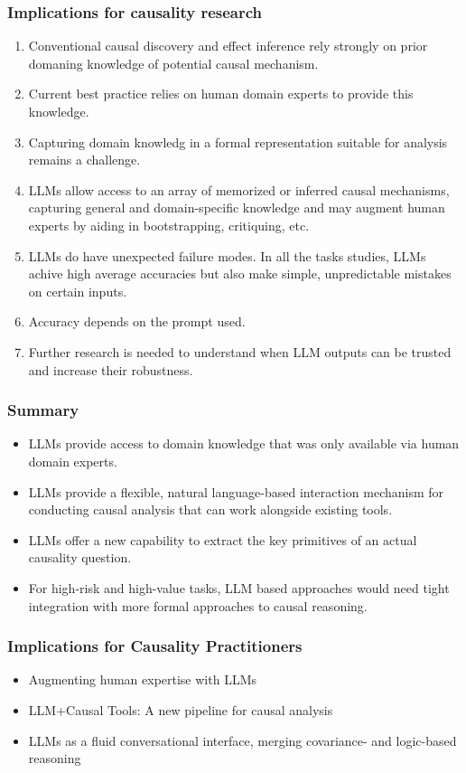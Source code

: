 \documentclass{beamer}
\begin{document}
\begin{frame}
	\frametitle{Implications for causality research}
	\begin{enumerate}
		\item Conventional causal discovery and effect inference rely strongly on prior domaning knowledge of potential causal mechanism. 
		\item Current best practice relies on human domain experts to provide this knowledge.
		\item Capturing domain knowledg in a formal representation suitable for analysis remains a challenge.
		\item LLMs allow access to an array of memorized or inferred causal mechanisms, capturing general and domain-specific knowledge and may augment human experts by aiding in bootstrapping, critiquing, etc.
		\item LLMs do have unexpected failure modes. In all the tasks studies, LLMs achive high average accuracies but also make simple, unpredictable mistakes on certain inputs.
		\item Accuracy depends on the prompt used.
		\item Further research is needed to understand when LLM outputs can be trusted and increase their robustness.
	\end{enumerate}
\end{frame}

\begin{frame}
	\frametitle{Summary}
	\begin{itemize}
		\item LLMs provide access to domain knowledge that was only available
			via human domain experts.
		\item LLMs provide a flexible, natural language-based interaction 
			mechanism for conducting causal analysis that can work
			alongside existing tools.
		\item LLMs offer a new capability to extract the key primitives of
			an actual causality question.
		\item For high-risk and high-value tasks, LLM based approaches would
			need tight integration with more formal approaches to
			causal reasoning.
	\end{itemize}
\end{frame}

\begin{frame}
	\frametitle{Implications for Causality Practitioners}
	\begin{itemize}
		\item Augmenting human expertise with LLMs
		\item LLM+Causal Tools: A new pipeline for causal analysis
		\item LLMs as a fluid conversational interface, merging covariance-
			and logic-based reasoning
	\end{itemize}
\end{frame}
\end{document}
